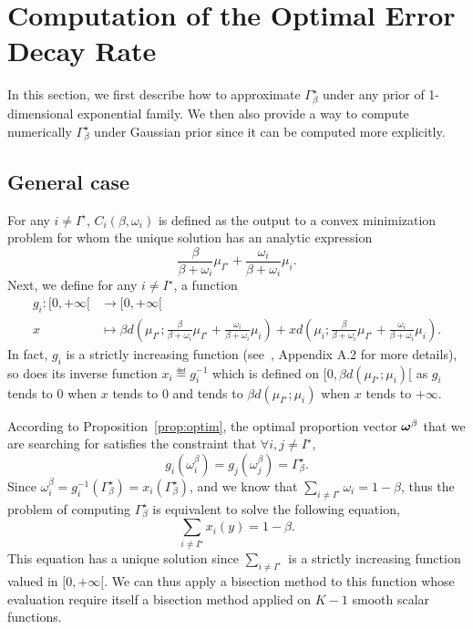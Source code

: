 \section{Computation of the Optimal Error Decay Rate}\label{app:rate}

In this section, we first describe how to approximate $\Gamma_{\beta}^\star$ under any prior of 1-dimensional exponential family. We then also provide a way to compute numerically $\Gamma_{\beta}^\star$ under Gaussian prior since it can be computed more explicitly.

\subsection{General case}

For any $i\neq I^\star$, $C_i(\beta,\omega_i)$ is defined as the output to a convex minimization problem for whom the unique solution has an analytic expression
\[
    \frac{\beta}{\beta+\omega_i}\mu_{I^\star} + \frac{\omega_i}{\beta+\omega_i}\mu_i.
\]
Next, we define for any $i\neq I^\star$, a function
\begin{align*}
  g_i \colon [0,+\infty[ &\to [0,+\infty[\\
  x &\mapsto \beta d\left(\mu_{I^\star};\frac{\beta}{\beta+\omega_i}\mu_{I^\star} + \frac{\omega_i}{\beta+\omega_i}\mu_i\right) + x d\left(\mu_i;\frac{\beta}{\beta+\omega_i}\mu_{I^\star} + \frac{\omega_i}{\beta+\omega_i}\mu_i\right).
\end{align*}
In fact, $g_i$ is a strictly increasing function (see~\citealt{garivier2016tracknstop}, Appendix A.2 for more details), so does its inverse function $x_i \eqdef g_i^{-1}$ which is defined on $[0, \beta d(\mu_{I^\star};\mu_i)[$ as $g_i$ tends to 0 when $x$ tends to 0 and tends to $\beta d(\mu_{I^\star};\mu_i)$ when $x$ tends to $+\infty$.

According to Proposition~\ref{prop:optim}, the optimal proportion vector ${\boldsymbol \omega}^\beta$ that we are searching for satisfies the constraint that $\forall i,j\neq I^\star$,
\[
    g_i(\omega_i^\beta) = g_j(\omega_j^\beta) = \Gamma_{\beta}^\star.
\]
Since $\omega_i^\beta = g_i^{-1}(\Gamma_{\beta}^\star) = x_i(\Gamma_{\beta}^\star)$, and we know that $\sum_{i\neq I^\star} \omega_i = 1-\beta$, thus the problem of computing $\Gamma_{\beta}^\star$ is equivalent to solve the following equation,
\[
    \sum_{i\neq I^\star} x_i(y) = 1 - \beta.
\]
This equation has a unique solution since $\sum_{i\neq I^\star}$ is a strictly increasing function valued in $[0, +\infty[$. We can thus apply a bisection method to this function whose evaluation require itself a bisection method applied on $K-1$ smooth scalar functions.

